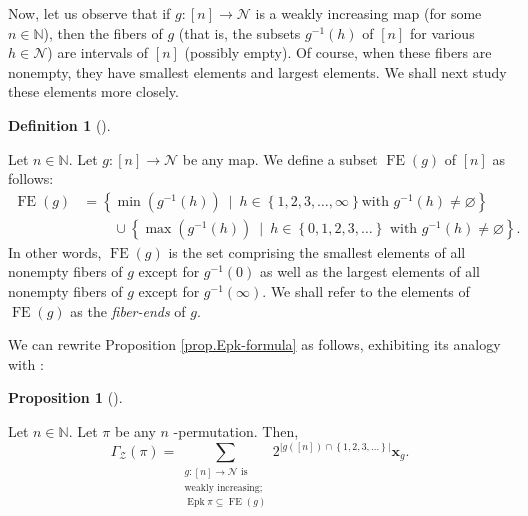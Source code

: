 \documentclass[numbers=enddot,12pt,final,onecolumn,notitlepage]{scrartcl}%
\theoremstyle{definition}
\newtheorem{prop}[theo]{Proposition}
\newenvironment{proposition}[1][]
{\begin{prop}[#1]\begin{leftbar}}
{\end{leftbar}\end{prop}}
\newtheorem{defi}[theo]{Definition}
\newenvironment{definition}[1][]
{\begin{defi}[#1]\begin{leftbar}}
{\end{leftbar}\end{defi}}
\let\sumnonlimits\sum
\renewcommand{\sum}{\sumnonlimits\limits}
\begin{document}
Now, let us observe that if $g:\left[  n\right]  \rightarrow\mathcal{N}$ is a
weakly increasing map (for some $n\in\mathbb{N}$), then the fibers of $g$
(that is, the subsets $g^{-1}\left(  h\right)  $ of $\left[  n\right]  $ for
various $h\in\mathcal{N}$) are intervals of $\left[  n\right]  $ (possibly
empty). Of course, when these fibers are nonempty, they have smallest elements
and largest elements. We shall next study these elements more closely.

\begin{definition}
\label{def.fiberends}Let $n\in\mathbb{N}$. Let $g:\left[  n\right]
\rightarrow\mathcal{N}$ be any map. We define a subset $\operatorname*{FE}%
\left(  g\right)  $ of $\left[  n\right]  $ as follows:%
\begin{align*}
\operatorname*{FE}\left(  g\right)   &  =\left\{  \min\left(  g^{-1}\left(
h\right)  \right)  \ \mid\ h\in\left\{  1,2,3,\ldots,\infty\right\}  \text{
with }g^{-1}\left(  h\right)  \neq\varnothing\right\} \\
&  \ \ \ \ \ \ \ \ \ \ \cup\left\{  \max\left(  g^{-1}\left(  h\right)
\right)  \ \mid\ h\in\left\{  0,1,2,3,\ldots\right\}  \text{ with }%
g^{-1}\left(  h\right)  \neq\varnothing\right\}  .
\end{align*}
In other words, $\operatorname*{FE}\left(  g\right)  $ is the set comprising
the smallest elements of all nonempty fibers of $g$ except for $g^{-1}\left(
0\right)  $ as well as the largest elements of all nonempty fibers of $g$
except for $g^{-1}\left(  \infty\right)  $. We shall refer to the elements of
$\operatorname*{FE}\left(  g\right)  $ as the \textit{fiber-ends} of $g$.
\end{definition}

We can rewrite Proposition \ref{prop.Epk-formula} as follows, exhibiting its
analogy with \cite[Proposition 2.2]{Stembr97}:

\begin{proposition}
\label{prop.Epk-formula2}Let $n\in\mathbb{N}$. Let $\pi$ be any $n$%
-permutation. Then,%
\[
\Gamma_{\mathcal{Z}}\left(  \pi\right)  =\sum_{\substack{g:\left[  n\right]
\rightarrow\mathcal{N}\text{ is}\\\text{weakly increasing;}%
\\\operatorname*{Epk}\pi\subseteq\operatorname*{FE}\left(  g\right)
}}2^{\left\vert g\left(  \left[  n\right]  \right)  \cap\left\{
1,2,3,\ldots\right\}  \right\vert }\mathbf{x}_{g}.
\]

\end{proposition}
\end{document}
